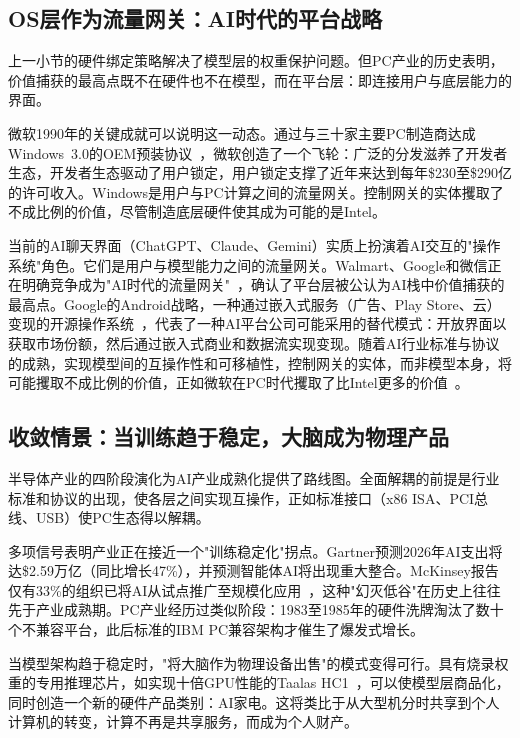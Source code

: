 \subsection{OS层作为流量网关：AI时代的平台战略}
\label{sec:os-gateway}

上一小节的硬件绑定策略解决了模型层的权重保护问题。但PC产业的历史表明，价值捕获的最高点既不在硬件也不在模型，而在平台层：即连接用户与底层能力的界面。

微软1990年的关键成就可以说明这一动态。通过与三十家主要PC制造商达成Windows~3.0的OEM预装协议~\cite{licendi2024mslicensing}，微软创造了一个飞轮：广泛的分发滋养了开发者生态，开发者生态驱动了用户锁定，用户锁定支撑了近年来达到每年\$230至\$290亿的许可收入。Windows是用户与PC计算之间的流量网关。控制网关的实体攫取了不成比例的价值，尽管制造底层硬件使其成为可能的是Intel。

当前的AI聊天界面（ChatGPT、Claude、Gemini）实质上扮演着AI交互的"操作系统"角色。它们是用户与模型能力之间的流量网关。Walmart、Google和微信正在明确竞争成为"AI时代的流量网关"~\cite{ceibs2025aiagents}，确认了平台层被公认为AI栈中价值捕获的最高点。Google的Android战略，一种通过嵌入式服务（广告、Play Store、云）变现的开源操作系统~\cite{wikipedia2024msopensource}，代表了一种AI平台公司可能采用的替代模式：开放界面以获取市场份额，然后通过嵌入式商业和数据流实现变现。随着AI行业标准与协议的成熟，实现模型间的互操作性和可移植性，控制网关的实体，而非模型本身，将可能攫取不成比例的价值，正如微软在PC时代攫取了比Intel更多的价值~\cite{ccia2025competition}。

\subsection{收敛情景：当训练趋于稳定，大脑成为物理产品}
\label{sec:convergence}

半导体产业的四阶段演化为AI产业成熟化提供了路线图。全面解耦的前提是行业标准和协议的出现，使各层之间实现互操作，正如标准接口（x86 ISA、PCI总线、USB）使PC生态得以解耦。

多项信号表明产业正在接近一个"训练稳定化"拐点。Gartner预测2026年AI支出将达\$2.59万亿（同比增长47\%），并预测智能体AI将出现重大整合。McKinsey报告仅有33\%的组织已将AI从试点推广至规模化应用~\cite{mckinsey2025aisurvey}，这种"幻灭低谷"在历史上往往先于产业成熟期。PC产业经历过类似阶段：1983至1985年的硬件洗牌淘汰了数十个不兼容平台，此后标准的IBM PC兼容架构才催生了爆发式增长。

当模型架构趋于稳定时，"将大脑作为物理设备出售"的模式变得可行。具有烧录权重的专用推理芯片，如实现十倍GPU性能的Taalas HC1~\cite{taalas_2026_hc1}，可以使模型层商品化，同时创造一个新的硬件产品类别：AI家电。这将类比于从大型机分时共享到个人计算机的转变，计算不再是共享服务，而成为个人财产。

